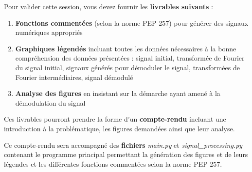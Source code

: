 
Pour valider cette session, vous devez fournir les \textbf{livrables suivants} :

\begin{enumerate}
\item \textbf{Fonctions commentées} (selon la norme PEP 257) pour générer des signaux numériques appropriés
\item \textbf{Graphiques légendés} incluant toutes les données nécessaires à la bonne compréhension des données présentées : signal initial, transformée de Fourier du signal initial, signaux générés pour démoduler le signal, transformées de Fourier intermédiaires, signal démodulé
\item \textbf{Analyse des figures} en insistant sur la démarche ayant amené à la démodulation du signal
\end{enumerate}

\medskip

Ces livrables pourront prendre la forme d'un \textbf{compte-rendu} incluant une introduction à la problématique, les figures demandées ainsi que leur analyse.

Ce compte-rendu sera accompagné des \textbf{fichiers} \mbox{\textit{main.py}} et \mbox{\textit{signal\_processing.py}} contenant le programme principal permettant la génération des figures et de leurs légendes et les différentes fonctions commentées selon la norme PEP 257.